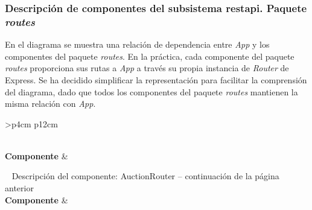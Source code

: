 \subsubsection{Descripción de componentes del subsistema restapi. Paquete \textit{routes}}
En el diagrama se muestra una relación de dependencia entre \textit{App} y los componentes del paquete \textit{routes}. 
En la práctica, cada componente del paquete \textit{routes} proporciona sus rutas a \textit{App} a través su propia instancia de \textit{Router} de Express. 
Se ha decidido simplificar la representación para facilitar la comprensión del diagrama, dado que todos los componentes del paquete \textit{routes} mantienen la misma relación con \textit{App}.

\begin{longtable}{
    >{}p{4cm}
    p{12cm}
    }
    \caption{Descripción del componente:  AuctionRouter} \label{table:descripcion_auctionrouter} \\
    \toprule
    \textbf{Componente} &  \\
    \endfirsthead
    
    {{ \tablename\ \thetable{} Descripción del componente:  AuctionRouter -- continuación de la página anterior}} \\
    \toprule
    \textbf{Componente} &  \\
    \midrule
    \endhead
    
    \midrule
     \\ 
    \endfoot
    
    \bottomrule
    \endlastfoot
    

\end{longtable}

